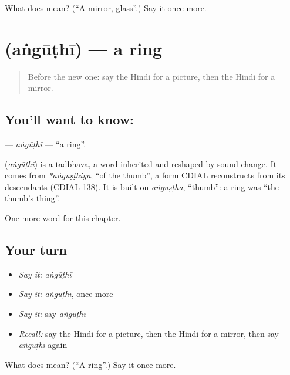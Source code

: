 \begin{tcolorbox}[breakable,colback=teal!4,colframe=teal!35!black,title={Before you move on}]
What does  mean? (\textquotedblleft{}A mirror, glass\textquotedblright{}.) Say it once more.
\end{tcolorbox}
\section[\texorpdfstring{\hi{अंगूठी} (aṅgūṭhī)}{अंगूठी (aṅgūṭhī)}]{ (aṅgūṭhī) — a ring}

\label{lesson:HI-C134-anguthi}



\begin{quote}
Before the new one: say the Hindi for a picture, then the Hindi for a mirror.
\end{quote}

\subsection*{You'll want to know: }
\textbf{} — \emph{aṅgūṭhī} — \textquotedblleft{}a ring\textquotedblright{}.

\begin{cousinweb}
\textbf{} (\emph{aṅgūṭhī}) is a tadbhava, a word inherited and reshaped by sound change. It comes from \emph{*aṅguṣṭhiya}, \textquotedblleft{}of the thumb\textquotedblright{}, a form CDIAL reconstructs from its descendants (CDIAL 138). It is built on \emph{aṅguṣṭha}, \textquotedblleft{}thumb\textquotedblright{}: a ring was \textquotedblleft{}the thumb's thing\textquotedblright{}.
\end{cousinweb}

\begin{grammarlens}[title={What you've built}]
One more word for this chapter.
\end{grammarlens}

\subsection*{Your turn}
\begin{itemize}
\raggedright
  \item \emph{Say it:} \emph{aṅgūṭhī}
  \item \emph{Say it:} \emph{aṅgūṭhī}, once more
  \item \emph{Say it:} say \emph{aṅgūṭhī}
  \item \emph{Recall:} say the Hindi for a picture, then the Hindi for a mirror, then say \emph{aṅgūṭhī} again
\end{itemize}

\begin{tcolorbox}[breakable,colback=teal!4,colframe=teal!35!black,title={Before you move on}]
What does  mean? (\textquotedblleft{}A ring\textquotedblright{}.) Say it once more.
\end{tcolorbox}
